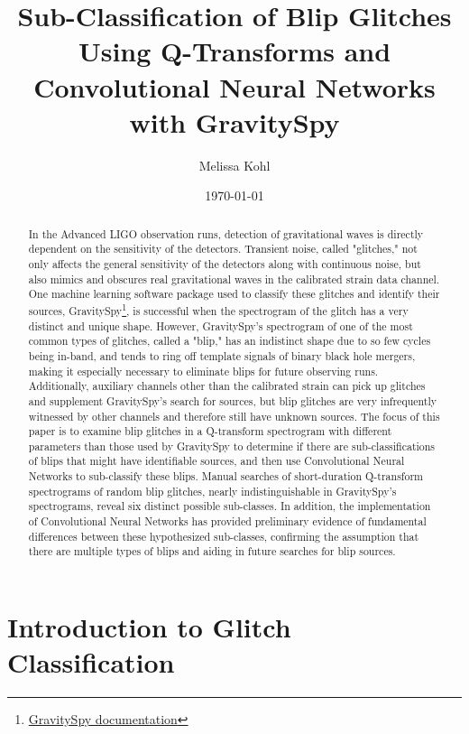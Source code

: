 \documentclass[a4paper]{article}
\title{Sub-Classification of Blip Glitches Using Q-Transforms and Convolutional Neural Networks with GravitySpy}
\author{Melissa Kohl}
\date{\today}
\begin{document}
\maketitle
\graphicspath{ {images/} }

\begin{abstract}

In the Advanced LIGO observation runs, detection of gravitational waves is directly dependent on the sensitivity of the detectors. Transient noise, called "glitches," not only affects the general sensitivity of the detectors along with continuous noise, but also mimics and obscures real gravitational waves in the calibrated strain data channel. One machine learning software package used to classify these glitches and identify their sources, GravitySpy\footnote{\href{https://gravity-spy.github.io}{GravitySpy documentation}}, is successful when the spectrogram of the glitch has a very distinct and unique shape. However, GravitySpy's spectrogram of one of the most common types of glitches, called a "blip," has an indistinct shape due to so few cycles being in-band, and tends to ring off template signals of binary black hole mergers, making it especially necessary to eliminate blips for future observing runs. Additionally, auxiliary channels other than the calibrated strain can pick up glitches and supplement GravitySpy's search for sources, but blip glitches are very infrequently witnessed by other channels and therefore still have unknown sources. The focus of this paper is to examine blip glitches in a Q-transform spectrogram with different parameters than those used by GravitySpy to determine if there are sub-classifications of blips that might have identifiable sources, and then use Convolutional Neural Networks to sub-classify these blips. Manual searches of short-duration Q-transform spectrograms of random blip glitches, nearly indistinguishable in GravitySpy's spectrograms, reveal six distinct possible sub-classes. In addition, the implementation of Convolutional Neural Networks has provided preliminary evidence of fundamental differences between these hypothesized sub-classes, confirming the assumption that there are multiple types of blips and aiding in future searches for blip sources.

\end{abstract} 

\section{Introduction to Glitch Classification} \label{introduction}
\end{document}
